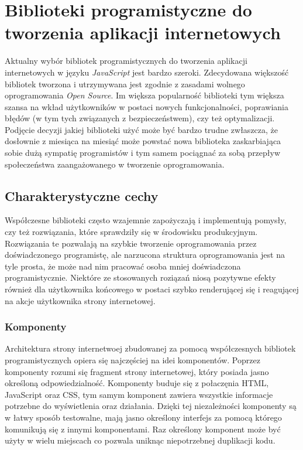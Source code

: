 \documentclass[polish, twoside, 12pt]{mwart}
\let\stdsection\section
\renewcommand*{\section}{\clearpage\stdsection}
\begin{document}
\section{Biblioteki programistyczne do tworzenia aplikacji internetowych}

Aktualny wybór bibliotek programistycznych do tworzenia aplikacji internetowych w języku \emph{JavaScript} jest bardzo szeroki. Zdecydowana większość bibliotek tworzona i utrzymywana jest zgodnie z zasadami wolnego oprogramowania \emph{Open Source}. Im większa popularność biblioteki tym większa szansa na wkład użytkowników w postaci nowych funkcjonalności, poprawiania błędów (w tym tych związanych z bezpieczeństwem), czy też optymalizacji. Podjęcie decyzji jakiej biblioteki użyć może być bardzo trudne zwłaszcza, że dosłownie z miesiąca na miesiąć może powstać nowa biblioteka zaskarbiająca sobie dużą sympatię programistów i tym samem pociągnać za sobą przepływ społeczeństwa zaangażowanego w tworzenie oprogramowania. 

\subsection{Charakterystyczne cechy}

Współczesne biblioteki często wzajemnie zapożyczają i implementują pomysły, czy też rozwiązania, które sprawdziły się w środowisku produkcyjnym. Rozwiązania te pozwalają na szybkie tworzenie oprogramowania przez doświadczonego programistę, ale narzucona struktura oprogramowania jest na tyle prosta, że może nad nim pracować osoba mniej doświadczona programistycznie. Niektóre ze stosowanych roziązań niosą pozytywne efekty również dla użytkownika końcowego w postaci szybko renderującej się i reagującej na akcje użytkownika strony internetowej.

\subsubsection{Komponenty}

Architektura strony internetwoej zbudowanej za pomocą współczesnych bibliotek programistycznych opiera się najczęściej na idei komponentów. Poprzez komponenty rozumi się fragment strony internetowej, który posiada jasno określoną odpowiedzialność. Komponenty buduje się z połaczęnia HTML, JavaScript oraz CSS, tym samym komponent zawiera wszystkie informacje potrzebne do wyświetlenia oraz działania. Dzięki tej niezależności komponenty są w łatwy sposób testowalne, mają jasno określony interfejs za pomocą którego komunikują się z innymi komponentami. Raz określony komponent może być użyty w wielu miejscach co pozwala uniknąc niepotrzebnej duplikacji kodu.
\end{document}
